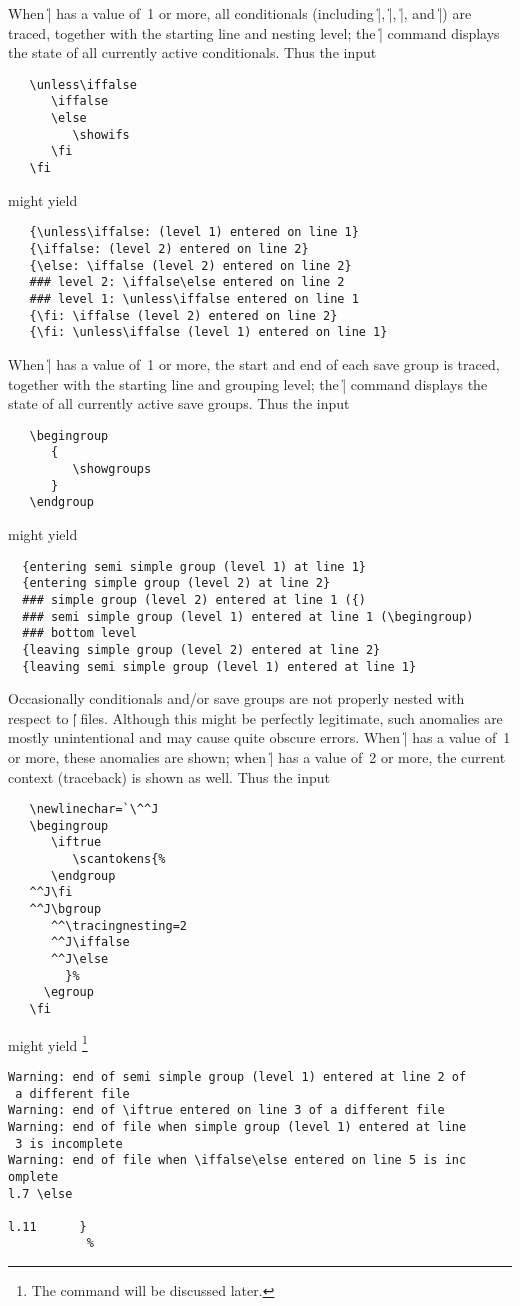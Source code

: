 \documentclass[11pt]{article}
\begin{document}
When \|\tracingifs| has a value of~1 or more, all conditionals
(including \|\unless|, \|\or|, \|\else|, and \|\fi|) are traced, together
with the starting line and nesting level; the \|\showifs| command displays
the state of all currently active conditionals. Thus the input
\begin{verbatim}
   \unless\iffalse
      \iffalse
      \else
         \showifs
      \fi
   \fi
\end{verbatim}
might yield
\begin{verbatim}
   {\unless\iffalse: (level 1) entered on line 1}
   {\iffalse: (level 2) entered on line 2}
   {\else: \iffalse (level 2) entered on line 2}
   ### level 2: \iffalse\else entered on line 2
   ### level 1: \unless\iffalse entered on line 1
   {\fi: \iffalse (level 2) entered on line 2}
   {\fi: \unless\iffalse (level 1) entered on line 1}
\end{verbatim}

When \|\tracinggroups| has a value of~1 or more, the start and end of
each save group is traced, together with the starting line and grouping
level; the \|\showgroups| command displays the state of all currently
active save groups. Thus the input
\begin{verbatim}
   \begingroup
      {
         \showgroups
      }
   \endgroup
\end{verbatim}
might yield
\begin{verbatim}
  {entering semi simple group (level 1) at line 1}
  {entering simple group (level 2) at line 2}
  ### simple group (level 2) entered at line 1 ({)
  ### semi simple group (level 1) entered at line 1 (\begingroup)
  ### bottom level
  {leaving simple group (level 2) entered at line 2}
  {leaving semi simple group (level 1) entered at line 1}
\end{verbatim}

Occasionally conditionals and/or save groups are not properly nested
with respect to \|| files.  Although this might be perfectly
legitimate, such anomalies are mostly unintentional and may cause quite
obscure errors.  When \|\tracingnesting| has a value of~1 or more,
these anomalies are shown; when \|\tracingnesting| has a value of~2 or more,
the current context (traceback) is shown as well. Thus the input
\begin{verbatim}
   \newlinechar=`\^^J
   \begingroup
      \iftrue
         \scantokens{%
      \endgroup
   ^^J\fi
   ^^J\bgroup
      ^^\tracingnesting=2
      ^^J\iffalse
      ^^J\else
        }%
     \egroup
   \fi
\end{verbatim}
might yield%
\footnote{The  command will be discussed later.}
\begin{verbatim}
Warning: end of semi simple group (level 1) entered at line 2 of
 a different file
Warning: end of \iftrue entered on line 3 of a different file
Warning: end of file when simple group (level 1) entered at line
 3 is incomplete
Warning: end of file when \iffalse\else entered on line 5 is inc
omplete
l.7 \else

l.11      }
           %
\end{verbatim}
\end{document}
